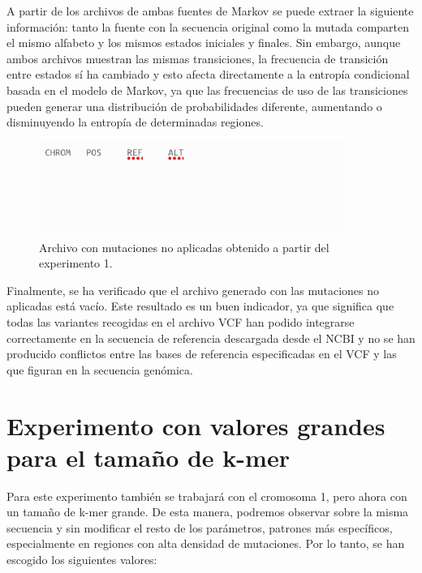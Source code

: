 \documentclass[11pt,spanish,listoffigures,listoftables]{tfgetsinf}
\begin{document}
A partir de los archivos de ambas fuentes de Markov se puede extraer la siguiente información: tanto la fuente con la secuencia original como la mutada comparten el mismo alfabeto y los mismos estados iniciales y finales. Sin embargo, aunque ambos archivos muestran las mismas transiciones, la frecuencia de transición entre estados sí ha cambiado y esto afecta directamente a la entropía condicional basada en el modelo de Markov, ya que las frecuencias de uso de las transiciones pueden generar una distribución de probabilidades diferente, aumentando o disminuyendo la entropía de determinadas regiones. 

\begin{figure}[H]
      \centering
      \includegraphics[width=0.9\textwidth]{mut_exp1.png}
      \caption{Archivo con mutaciones no aplicadas obtenido a partir del experimento 1.}
      \label{fig:etiqueta_opcional15}
\end{figure}

Finalmente, se ha verificado que el archivo generado con las mutaciones no aplicadas está vacío. Este resultado es un buen indicador, ya que significa que todas las variantes recogidas en el archivo \acs{VCF} han podido integrarse correctamente en la secuencia de referencia descargada desde el \acs{NCBI} y no se han producido conflictos entre las bases de referencia especificadas en el \acs{VCF} y las que figuran en la secuencia genómica. 


\section{Experimento con valores grandes para el tamaño de k-mer}

Para este experimento también se trabajará con el cromosoma 1, pero ahora con un tamaño de k-mer grande. De esta manera, podremos observar sobre la misma secuencia y sin modificar el resto de los parámetros, patrones más específicos, especialmente en regiones con alta densidad de mutaciones. Por lo tanto, se han escogido los siguientes valores:
\end{document}
